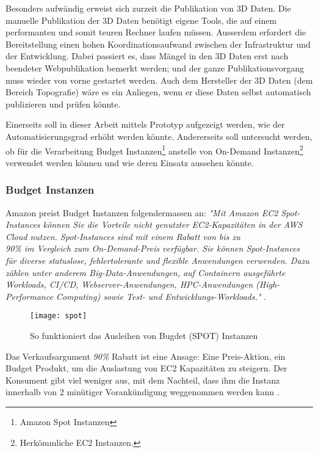 Besonders aufwändig erweist sich zurzeit die Publikation von 3D Daten. Die manuelle Publikation
der 3D Daten benötigt eigene Tools, die auf einem performanten und somit teuren Rechner laufen
müssen. Ausserdem erfordert die Bereitstellung einen hohen Koordinationsaufwand zwischen der
Infrastruktur und der Entwicklung. Dabei passiert es, dass Mängel in den 3D Daten erst nach
beendeter Webpublikation bemerkt werden; und der ganze Publikationsvorgang muss wieder von
vorne gestartet werden.
Auch dem Hersteller der 3D Daten (dem Bereich Topografie) wäre es ein Anliegen, wenn er diese
Daten selbst automatisch publizieren und prüfen könnte.

Einerseits soll in dieser Arbeit mittels Prototyp aufgezeigt werden, wie der Automatisierungsgrad erhöht werden könnte. Andererseits soll untersucht werden, ob für die Verarbeitung Budget Instanzen\footnote{Amazon Spot Instanzen} anstelle von On-Demand Instanzen\footnote{Herkömmliche EC2 Instanzen.} verwendet werden können und wie deren Einsatz aussehen könnte.

\subsubsection{Budget Instanzen}\label{kap:bugdet_instanzen}
Amazon preist Budget Instanzen folgendermassen an: \textit{"Mit Amazon EC2 Spot-Instances können Sie die Vorteile nicht genutzter EC2-Kapazitäten in der AWS Cloud nutzen. Spot-Instances sind mit einem Rabatt von bis zu\\ 90\% im Vergleich zum On-Demand-Preis verfügbar. Sie können Spot-Instances für diverse statuslose, fehlertolerante und flexible Anwendungen verwenden. Dazu zählen unter anderem Big-Data-Anwendungen, auf Containern ausgeführte Workloads, CI/CD, Webserver-Anwendungen, HPC-Anwendungen (High-Performance Computing) sowie Test- und Entwicklungs-Workloads."} \cite{AmazonAWSSpot:1}.


\begin{figure}[H]
	\centering
	\texttt{[image: spot]}
	\caption{So funktioniert das Ausleihen von Bugdet (SPOT) Instanzen}
	\label{fig:spot}
\end{figure}

Das Verkaufsargument \emph{90\%} Rabatt ist eine Ansage: Eine Preis-Aktion, ein Budget Produkt, um die Auslastung von EC2 Kapazitäten zu steigern. Der Konsument gibt viel weniger aus, mit dem Nachteil, dass ihm die Instanz innerhalb von 2 minütiger Vorankündigung weggenommen werden kann \cite{AmazonAWSSpot:1}.

